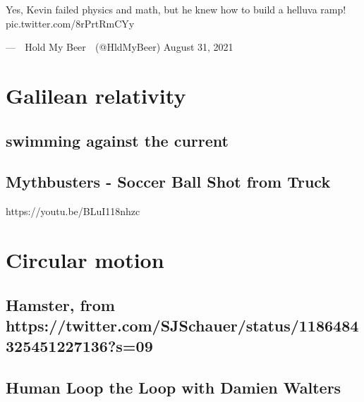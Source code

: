 \documentclass[
  letterpaper,
  DIV=11,
  numbers=noendperiod]{scrreprt}
\begin{document}
Yes, Kevin failed physics and math, but he knew how to build a helluva
ramp! 🍺 🥴 pic.twitter.com/8rPrtRmCYy

--- 🍺 Hold My Beer 🍺 (@HldMyBeer) August 31, 2021

\section*{Galilean relativity}\label{galilean-relativity}


\subsection*{swimming against the
current}\label{swimming-against-the-current}

\subsection*{Mythbusters - Soccer Ball Shot from
Truck}\label{mythbusters---soccer-ball-shot-from-truck}

https://youtu.be/BLuI118nhzc

\section*{Circular motion}\label{circular-motion}


\subsection*{Hamster, from
https://twitter.com/SJSchauer/status/1186484325451227136?s=09}\label{hamster-from-httpstwitter.comsjschauerstatus1186484325451227136s09}

\subsection*{Human Loop the Loop with Damien
Walters}\label{human-loop-the-loop-with-damien-walters}
\end{document}
